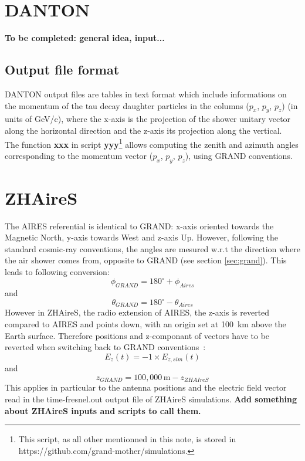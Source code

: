 \documentclass[12pt]{article}
\newcommand*{\courierfont}{\fontfamily{pcr}\selectfont}
\begin{document}
\section{DANTON}  \label{sec:danton}
{\bf To be completed: general idea, input...}
%
\subsection{Output file format}
DANTON output files are tables in text format which include informations on the momentum of the tau decay daughter particles in the columns ($p_x$, $p_y$, $p_z$) (in units of GeV/c), where the x-axis is the projection of the shower unitary vector along the horizontal direction and the z-axis its projection along the vertical.  \\
The function {\bf xxx} in script {\bf yyy}\footnote{This script, as all other mentionned in this note, is stored in https://github.com/grand-mother/simulations.} allows computing the zenith and azimuth angles corresponding to the momentum vector ($p_x$, $p_y$, $p_z$), using GRAND conventions.

%
\section{ZHAireS}\label{sec:zhaires}
The AIRES referential is identical to GRAND: x-axis oriented towards the Magnetic North, y-axis towards West and z-axis Up. However, following the standard cosmic-ray conventions, the angles are mesured w.r.t the direction where the air shower comes from, opposite to GRAND (see section \ref{sec:grand}). This leads to following conversion:
\[\phi_{GRAND}=180^\circ +\phi_{Aires}\] and \[\theta_{GRAND}=180^\circ -\theta_{Aires} \]
However in ZHAireS, the radio extension of AIRES, the z-axis is reverted compared to AIRES and points down, with an origin set at 100~km above the Earth surface. Therefore positions and z-componant of vectors have to be reverted when switching back to GRAND conventions~:\\
    \[E_z(t)=-1 \times E_{z,sim}(t) \] and
    \[z_{GRAND}= 100,000\,\mbox{m}-z_{ZHAIreS} \]
This applies in particular to the antenna positions and the electric field vector read in the {\courierfont time-fresnel.out} output file of ZHAireS simulations.
{\bf Add something about ZHAireS inputs and scripts to call them.}
\end{document}
